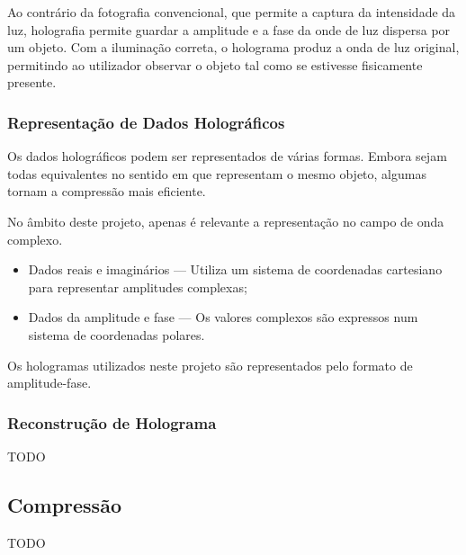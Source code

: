 Ao contrário da fotografia convencional, que permite a captura da intensidade da luz, holografia permite guardar a amplitude e a fase da onde de luz dispersa por um objeto. Com a iluminação correta, o holograma produz a onda de luz original, permitindo ao utilizador observar o objeto tal como se estivesse fisicamente presente.


\subsubsection{Representação de Dados Holográficos}
\label{sssec::estado-arte:holografia:representacao-dados}


Os dados holográficos podem ser representados de várias formas. Embora sejam todas equivalentes no sentido em que representam o mesmo objeto, algumas tornam a compressão mais eficiente. 


No âmbito deste projeto, apenas é relevante a representação no campo de onda complexo.


\begin{itemize}
    \item Dados reais e imaginários --- Utiliza um sistema de coordenadas cartesiano para representar amplitudes complexas;
    \item Dados da amplitude e fase --- Os valores complexos são expressos num sistema de coordenadas polares.
\end{itemize}

Os hologramas utilizados neste projeto são representados pelo formato de amplitude-fase.


\subsubsection{Reconstrução de Holograma}
\label{sssec::estado-arte:holografia:reconstrucao}

TODO


\subsection{Compressão}
\label{ssec::estado-arte:compressao}

TODO

